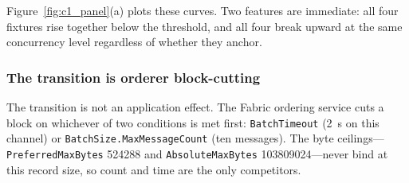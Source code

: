 \documentclass[final,5p,times,twocolumn]{elsarticle}
\begin{document}
\begin{table}[htbp]
\centering
\caption{Measured sustained throughput (TPS) by client concurrency and record
fixture. The transition at $c=10$ is the Fabric orderer switching from
time-based to count-based block cutting. \texttt{fabric\_only} follows the
\textsc{fabric-only} path; the other three follow the \textsc{hybrid} path and
anchor on every request.}
\label{tab:c1_throughput}
\end{table}


Figure~\ref{fig:c1_panel}(a) plots these curves. Two features are immediate: all
four fixtures rise together below the threshold, and all four break upward at
the same concurrency level regardless of whether they anchor.

\subsubsection*{\textbf{The transition is orderer block-cutting}}
The transition is not an application effect. The Fabric ordering service cuts a
block on whichever of two conditions is met first: \texttt{BatchTimeout}
(\SI{2}{\second} on this channel) or \texttt{BatchSize.MaxMessageCount} (ten
messages). The byte ceilings---\texttt{PreferredMaxBytes}
\SI{524288}{\byte} and \texttt{AbsoluteMaxBytes} \SI{103809024}{\byte}---never
bind at this record size, so count and time are the only competitors.
\end{document}

